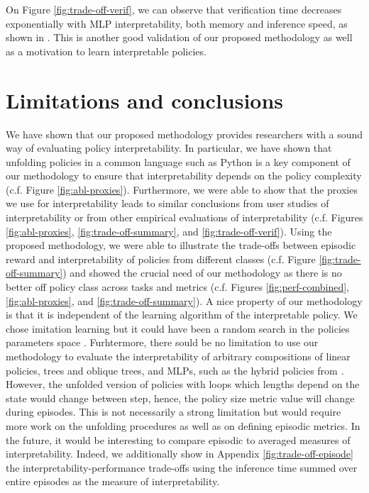 On Figure \ref{fig:trade-off-verif}, we can observe that verification time decreases exponentially with MLP interpretability, both memory and inference speed, as shown in \cite{lens-complexity}.
This is another good validation of our proposed methodology as well as a motivation to learn interpretable policies. 

\section{Limitations and conclusions}\label{sec:ccl}
We have shown that our proposed methodology provides researchers with a sound way of evaluating policy interpretability.
In particular, we have shown that unfolding policies in a common language such as Python is a key component of our methodology to ensure that interpretability depends on the policy complexity (c.f. Figure \ref{fig:abl-proxies}).
Furthermore, we were able to show that the proxies we use for interpretability leads to similar conclusions from user studies of interpretability or from other empirical evaluations of interpretability (c.f. Figures \ref{fig:abl-proxies}, \ref{fig:trade-off-summary}, and \ref{fig:trade-off-verif}).
Using the proposed methodology, we were able to illustrate the trade-offs between episodic reward and interpretability of policies from different classes (c.f. Figure \ref{fig:trade-off-summary}) and showed the crucial need of our methodology as there is no better off policy class across tasks and metrics (c.f. Figures \ref{fig:perf-combined}, \ref{fig:abl-proxies}, and \ref{fig:trade-off-summary}). 
A nice property of our methodology is that it is independent of the learning algorithm of the interpretable policy.
We chose imitation learning but it could have been a random search in the policies parameters space \cite{empirical-evidence}.
Furhtermore, there sould be no limitation to use our methodology to evaluate the interpretability of arbitrary compositions of linear policies, trees and oblique trees, and MLPs, such as the hybrid policies from \cite{shindo2024blendrl}.
However, the unfolded version of policies with loops which lengths depend on the state would change between step, hence, the policy size metric value will change during episodes.
This is not necessarily a strong limitation but would require more work on the unfolding procedures as well as on defining episodic metrics. 
In the future, it would be interesting to compare episodic to averaged measures of interpretability. Indeed, we additionally show in Appendix \ref{fig:trade-off-episode} the interpretability-performance trade-offs using the inference time summed over entire episodes as the measure of interpretability.
